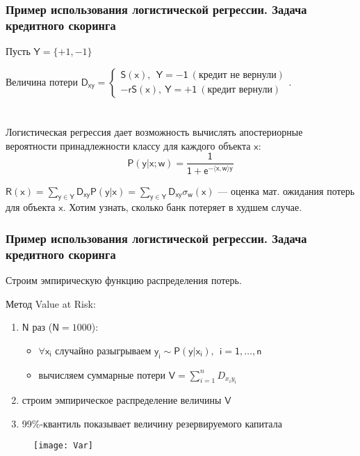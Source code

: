 \documentclass[unicode, notheorems]{beamer}
\begin{document}
\begin{frame}
\frametitle{Пример использования логистической регрессии. Задача кредитного скоринга}
Пусть $\mathsf{Y} = \{+1,-1\}$

Величина потери $\mathsf{D_{xy}}= \begin{cases} \mathsf{S(x),~~ Y=-1 ~(\text{кредит не вернули})} \\ 
	\mathsf{-rS(x)}, ~ \mathsf{Y=+1}~ (\text{кредит вернули}) \end{cases}$. \\
	
	~~\\
	~~\\
	
	Логистическая регрессия дает возможность вычислять апостериорные вероятности принадлежности классу для каждого объекта $\mathsf{x}$:
	\begin{equation*}
	\mathsf{P(y|x;w)=\frac{1}{1+e^{-\langle x,w \rangle y}}}
	\end{equation*}
	
	$\mathsf{R(x)=\sum\limits_{y\in Y}D_{xy}P(y|x)=\sum\limits_{y\in Y}D_{xy}\sigma_w(x)}$ --- оценка мат. ожидания потерь для объекта $\mathsf{x}$.
Хотим узнать, сколько банк потеряет в худшем случае.

\end{frame}

\begin{frame}
\frametitle{Пример использования логистической регрессии. Задача кредитного скоринга}


Строим эмпирическую функцию распределения потерь. 

Метод Value at Risk:
\begin{enumerate}
	\item {$\mathsf{N}$ раз ($\mathsf{N}=1000$): \begin{itemize}
	\item	$\forall \mathsf{x_i}$ случайно разыгрываем $\mathsf{y_i\sim P(y|x_i),~~i=1,\ldots,n}$\\
	\item вычисляем суммарные потери $\mathsf{V}=\sum \limits_{i=1}^n D_{x_iy_i}$
	\end{itemize}
	}
	\item строим эмпирическое распределение величины $\mathsf{V}$
	\item 99\%-квантиль показывает величину резервируемого капитала
\end{enumerate}
\begin{figure}[h]
	\begin{center}
		\begin{minipage}[h]{0.5\linewidth}
			\texttt{[image: Var]}
			\label{series_IRLS} %
		\end{minipage}
		
	\end{center}
\end{figure}
\end{frame}
\end{document}
